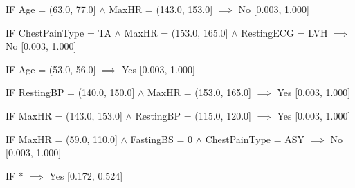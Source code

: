 IF Age = (63.0, 77.0] $\land$ MaxHR = (143.0, 153.0] $\implies$ No [0.003, 1.000]

IF ChestPainType = TA $\land$ MaxHR = (153.0, 165.0] $\land$ RestingECG = LVH $\implies$ No [0.003, 1.000]

IF Age = (53.0, 56.0] $\implies$ Yes [0.003, 1.000]

IF RestingBP = (140.0, 150.0] $\land$ MaxHR = (153.0, 165.0] $\implies$ Yes [0.003, 1.000]

IF MaxHR = (143.0, 153.0] $\land$ RestingBP = (115.0, 120.0] $\implies$ Yes [0.003, 1.000]

IF MaxHR = (59.0, 110.0] $\land$ FastingBS = 0 $\land$ ChestPainType = ASY $\implies$ No [0.003, 1.000]

IF * $\implies$ Yes [0.172, 0.524]
